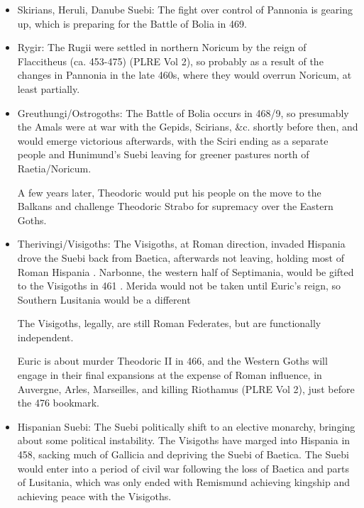 \documentclass{article}
\begin{document}
\begin{itemize}
		\item Skirians, Heruli, Danube Suebi:\newline
		The fight over control of Pannonia is gearing up, which is preparing for the Battle of Bolia in 469.
		
		\item Rygir:\newline
		The Rugii were settled in northern Noricum by the reign of Flaccitheus (ca. 453-475) (PLRE Vol 2), so probably as a result of the changes in Pannonia in the late 460s, where they would overrun Noricum, at least partially.
		
		\item Greuthungi/Ostrogoths:\newline
		The Battle of Bolia occurs in 468/9, so presumably the Amals were at war with the Gepids, Scirians, \&c. shortly before then, and would emerge victorious afterwards, with the Sciri ending as a separate people and Hunimund's Suebi leaving for greener pastures north of Raetia/Noricum.
		
		A few years later, Theodoric would put his people on the move to the Balkans and challenge Theodoric Strabo for supremacy over the Eastern Goths.
		
		\item Therivingi/Visigoths:\newline
		The Visigoths, at Roman direction, invaded Hispania drove the Suebi back from Baetica, afterwards not leaving, holding most of Roman Hispania \cite{CambridgeAncientHistory14}.
		Narbonne, the western half of Septimania, would be gifted to the Visigoths in 461 \cite{CambridgeAncientHistory14}.
		Merida would not be taken until Euric's reign, so Southern Lusitania would be a different 
		
		The Visigoths, legally, are still Roman Federates, but are functionally independent.
		
		Euric is about murder Theodoric II in 466, and the Western Goths will engage in their final expansions at the expense of Roman influence, in Auvergne, Arles, Marseilles, and killing Riothamus (PLRE Vol 2), just before the 476 bookmark.
		
		\item Hispanian Suebi:\newline
		The Suebi politically shift to an elective monarchy, bringing about some political instability.
		The Visigoths have marged into Hispania in 458, sacking much of Gallicia and depriving the Suebi of Baetica.
		The Suebi would enter into a period of civil war following the loss of Baetica and parts of Lusitania, which was only ended with Remismund achieving kingship and achieving peace with the Visigoths.
		

\end{itemize}
\end{document}
